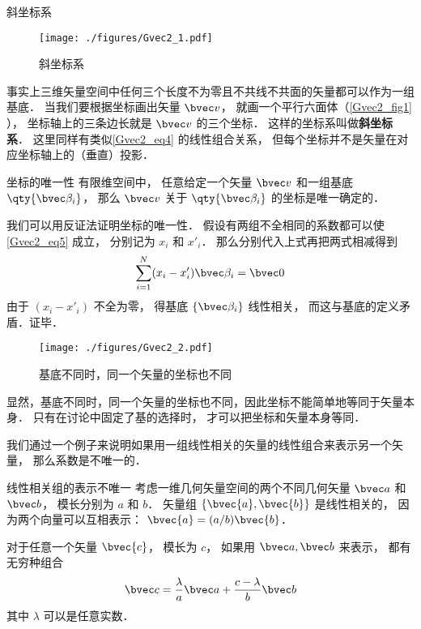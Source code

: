 \begin{example}{斜坐标系}\label{Gvec2_ex1}
\begin{figure}[ht]
\centering
\texttt{[image: ./figures/Gvec2\_1.pdf]}
\caption{斜坐标系} \label{Gvec2_fig1}
\end{figure}
事实上三维矢量空间中任何三个长度不为零且不共线不共面的矢量都可以作为一组基底． 当我们要根据坐标画出矢量 $\bvec v$， 就画一个平行六面体（\autoref{Gvec2_fig1} ）， 坐标轴上的三条边长就是 $\bvec v$ 的三个坐标． 这样的坐标系叫做\textbf{斜坐标系}． 这里同样有类似\autoref{Gvec2_eq4} 的线性组合关系， 但每个坐标并不是矢量在对应坐标轴上的（垂直）投影．
\end{example}

\begin{theorem}{坐标的唯一性}
有限维空间中， 任意给定一个矢量 $\bvec v$ 和一组基底 $\qty{\bvec \beta_i}$， 那么 $\bvec v$ 关于 $\qty{\bvec \beta_i}$ 的坐标是唯一确定的．
\end{theorem}
我们可以用反证法证明坐标的唯一性． 假设有两组不全相同的系数都可以使\autoref{Gvec2_eq5} 成立， 分别记为 $x_i$ 和 $x'_i$． 那么分别代入上式再把两式相减得到
\begin{equation}
\sum_{i=1}^N (x_i-x'_i) \bvec \beta_i = \bvec 0
\end{equation}
由于 $(x_i-x'_i)$ 不全为零， 得基底 $\{\bvec \beta_i\}$ 线性相关， 而这与基底的定义矛盾．证毕．
\begin{figure}[ht]
\centering
\texttt{[image: ./figures/Gvec2\_2.pdf]}
\caption{基底不同时，同一个矢量的坐标也不同} \label{Gvec2_fig2}
\end{figure}
显然，基底不同时，同一个矢量的坐标也不同，因此坐标不能简单地等同于矢量本身． 只有在讨论中固定了基的选择时， 才可以把坐标和矢量本身等同．

我们通过一个例子来说明如果用一组线性相关的矢量的线性组合来表示另一个矢量， 那么系数是不唯一的．

\begin{example}{线性相关组的表示不唯一}
考虑一维几何矢量空间的两个不同几何矢量 $\bvec a$ 和 $\bvec b$， 模长分别为 $a$ 和 $b$． 矢量组 $\{\bvec{a}, \bvec{b}\}$ 是线性相关的， 因为两个向量可以互相表示： $\bvec{a}=(a/b)\bvec{b}$．

对于任意一个矢量 $\bvec{c}$， 模长为 $c$， 如果用 $\bvec a, \bvec b$ 来表示， 都有无穷种组合
\begin{equation}
\bvec c = \frac{\lambda}{a} \bvec a + \frac{c - \lambda}{b} \bvec b
\end{equation}
其中 $\lambda$ 可以是任意实数．
\end{example}

